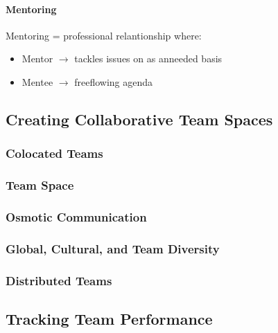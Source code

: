 \documentclass[letterpaper,10pt,english]{jupyterBook}
\begin{document}
\paragraph{Mentoring}
\label{\detokenize{APM/agile:mentoring}}
\sphinxAtStartPar
Mentoring = professional relantionship where:
\begin{itemize}
\item {} 
\sphinxAtStartPar
Mentor \(\rightarrow\) tackles issues on as an\sphinxhyphen{}needed basis

\item {} 
\sphinxAtStartPar
Mentee \(\rightarrow\) free\sphinxhyphen{}flowing agenda

\end{itemize}


\subsection{Creating Collaborative Team Spaces}
\label{\detokenize{APM/agile:creating-collaborative-team-spaces}}

\subsubsection{Co\sphinxhyphen{}located Teams}
\label{\detokenize{APM/agile:co-located-teams}}

\subsubsection{Team Space}
\label{\detokenize{APM/agile:team-space}}

\subsubsection{Osmotic Communication}
\label{\detokenize{APM/agile:osmotic-communication}}

\subsubsection{Global, Cultural, and Team Diversity}
\label{\detokenize{APM/agile:global-cultural-and-team-diversity}}

\subsubsection{Distributed Teams}
\label{\detokenize{APM/agile:distributed-teams}}

\subsection{Tracking Team Performance}
\label{\detokenize{APM/agile:tracking-team-performance}}
\end{document}
